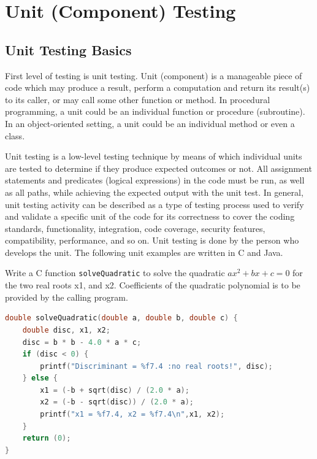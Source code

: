 \setchapterpreamble[u]{\margintoc}
\chapter{Unit (Component) Testing}
\section{Unit Testing Basics}
First level of testing is unit testing. Unit (component) is a manageable piece of code which may produce a result, perform a computation and return its result(s) to its caller, or may call some other function or method. In procedural programming, a unit could be an individual function or procedure (subroutine). In an object-oriented setting, a unit could be an individual method or even a class. 

Unit testing is a low-level testing technique by means of which individual units are tested to determine if they produce expected outcomes or not. All assignment statements and predicates (logical expressions) in the code must be run, as well as all paths, while achieving the expected output with the unit test. In general, unit testing activity can be described as a type of testing process used to verify and validate a specific unit of the code for its correctness to cover the coding standards, functionality, integration, code coverage, security features, compatibility, performance, and so on. Unit testing is done by the person who develops the unit. The following unit examples are written in C and Java.

\begin{example}
Write a C function \lstinline!solveQuadratic! to solve the quadratic $ax^2+bx+c=0$ for the two real roots x1, and x2. Coefficients of the quadratic polynomial is to be provided by the calling program.

\begin{lstlisting}[language=C, caption={A C function that solves the quadratic equation for the two real roots.}]
double solveQuadratic(double a, double b, double c) {
	double disc, x1, x2;
	disc = b * b - 4.0 * a * c;
	if (disc < 0) {
		printf("Discriminant = %f7.4 :no real roots!", disc);
	} else {
		x1 = (-b + sqrt(disc) / (2.0 * a);
		x2 = (-b - sqrt(disc)) / (2.0 * a);
		printf("x1 = %f7.4, x2 = %f7.4\n",x1, x2);
	}
	return (0);
}
\end{lstlisting}
\end{example}


